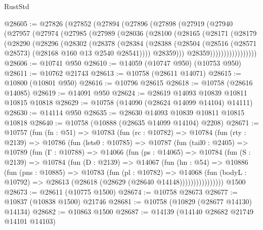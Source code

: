 \begin{lexlean}{RustStd}
\begin{coremodule}
@28605 := @27826
    (@27852
      (@27894
        (@27896
          (@27898
            (@27919
              (@27940
                (@27957
                  (@27974
                    (@27985
                      (@27989
                        (@28036
                          (@28100
                            (@28165
                              (@28171
                                (@28179
                                  (@28290
                                    (@28296
                                      (@28302
                                        (@28378
                                          (@28384
                                            (@28388
                                              (@28504
                                                (@28516
                                                  (@28571 @28573)
                                                  (@28168 @160 @13 @2540 @28541))))
                                            @28359)))
                                      @28359)))))))))))))))))
@28606 := @10741 @950
@28610 := @14059 (@10747 @950) (@10753 @950)
@28611 := @10762 @21743
@28613 := @10758 (@28611 @14071)
@28615 := @10800 (@10801 @950)
@28616 := @10796 @28615
@28618 := @10758 (@28616 @14085)
@28619 := @14091 @950
@28624 := @28619 @14093 @10839 @10811 @10815 @10818
@28629 := @10758 (@14090 (@28624 @14099 @14104) @14111)
@28630 := @14114 @950
@28635 := @28630 @14093 @10839 @10811 @10815 @10818
@28640 := @10758 (@10888 (@28635 @14099 @14104) @2208)
@28671 := @10757
    (fun (fn : @51) =>
    @10783
      (fun (rc : @10782) =>
      @10784
        (fun (rty : @2139) =>
        @10786
          (fun (lets0 : @10785) =>
          @10787
            (fun (tail0 : @2405) =>
            @10789
              (fun (Γ : @10788) =>
              @14066
                (fun (ps : @14065) =>
                @10784
                  (fun (S : @2139) =>
                  @10784
                    (fun (D : @2139) =>
                    @14067
                      (fun (hn : @54) =>
                      @10886
                        (fun (pns : @10885) =>
                        @10783
                          (fun (pl : @10782) =>
                          @14068
                            (fun (bodyL : @10792) =>
                            @28613 (@28618 (@28629 (@28640 @14148))))))))))))))))
    @1500
@28673 := @28611 (@10775 @1500)
@28674 := @10758 @28673
@28677 := @10837 (@10838 @1500) @21746
@28681 := @10758 (@10829 (@28677 @14130) @14134)
@28682 := @10863 @1500
@28687 := @14139 (@14140 @28682 @21749 @14101 @14103)

\end{coremodule}
\end{lexlean}
